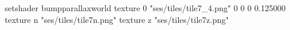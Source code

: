 setshader bumpparallaxworld
texture 0 "ses/tiles/tile7_4.png" 0 0 0 0.125000
texture n "ses/tiles/tile7n.png"
texture z "ses/tiles/tile7z.png"

